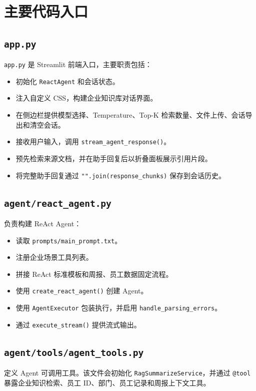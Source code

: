 \documentclass[UTF8,zihao=-4]{ctexart}
\begin{document}
\section{主要代码入口}

\subsection{\texttt{app.py}}

\texttt{app.py} 是 Streamlit 前端入口，主要职责包括：

\begin{itemize}
\item 初始化 \texttt{ReactAgent} 和会话状态。
\item 注入自定义 CSS，构建企业知识库对话界面。
\item 在侧边栏提供模型选择、Temperature、Top-K 检索数量、文件上传、会话导出和清空会话。
\item 接收用户输入，调用 \texttt{stream\_agent\_response()}。
\item 预先检索来源文档，并在助手回复后以折叠面板展示引用片段。
\item 将完整助手回复通过 \texttt{"".join(response\_chunks)} 保存到会话历史。
\end{itemize}

\subsection{\texttt{agent/react\_agent.py}}

负责构建 ReAct Agent：

\begin{itemize}
\item 读取 \texttt{prompts/main\_prompt.txt}。
\item 注册企业场景工具列表。
\item 拼接 ReAct 标准模板和周报、员工数据固定流程。
\item 使用 \texttt{create\_react\_agent()} 创建 Agent。
\item 使用 \texttt{AgentExecutor} 包装执行，并启用 \texttt{handle\_parsing\_errors}。
\item 通过 \texttt{execute\_stream()} 提供流式输出。
\end{itemize}

\subsection{\texttt{agent/tools/agent\_tools.py}}

定义 Agent 可调用工具。该文件会初始化 \texttt{RagSummarizeService}，并通过 \texttt{@tool} 暴露企业知识检索、员工 ID、部门、员工记录和周报上下文工具。
\end{document}
